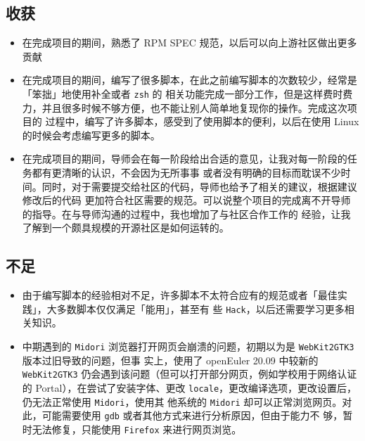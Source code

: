 \documentclass[letterpaper,12pt]{article}
\begin{document}
\subsection{收获}
    \begin{itemize}
        \item 在完成项目的期间，熟悉了 RPM SPEC 规范，以后可以向上游社区做出更多贡献
        \item 在完成项目的期间，编写了很多脚本，在此之前编写脚本的次数较少，经常是「笨拙」地使用补全或者 \verb!zsh! 的
        相关功能完成一部分工作，但是这样费时费力，并且很多时候不够方便，也不能让别人简单地复现你的操作。完成这次项目的
        过程中，编写了许多脚本，感受到了使用脚本的便利，以后在使用 Linux 的时候会考虑编写更多的脚本。
        \item 在完成项目的期间，导师会在每一阶段给出合适的意见，让我对每一阶段的任务都有更清晰的认识，不会因为无所事事
        或者没有明确的目标而耽误不少时间。同时，对于需要提交给社区的代码，导师也给予了相关的建议，根据建议修改后的代码
        更加符合社区需要的规范。可以说整个项目的完成离不开导师的指导。在与导师沟通的过程中，我也增加了与社区合作工作的
        经验，让我了解到一个颇具规模的开源社区是如何运转的。
    \end{itemize}

\subsection{不足}
    \begin{itemize}
        \item 由于编写脚本的经验相对不足，许多脚本不太符合应有的规范或者「最佳实践」，大多数脚本仅仅满足「能用」，甚至有
        些 \verb!Hack!，以后还需要学习更多相关知识。
        \item 中期遇到的 \verb!Midori! 浏览器打开网页会崩溃的问题，初期以为是 \verb!WebKit2GTK3! 版本过旧导致的问题，但事
        实上，使用了 openEuler 20.09 中较新的 \verb!WebKit2GTK3! 仍会遇到该问题（但可以打开部分网页，例如学校用于网络认证
        的 Portal），在尝试了安装字体、更改 \verb!locale!，更改编译选项，更改设置后，仍无法正常使用 \verb!Midori!，使用其
        他系统的 \verb!Midori! 却可以正常浏览网页。对此，可能需要使用 \verb!gdb! 或者其他方式来进行分析原因，但由于能力不
        够，暂时无法修复，只能使用 \verb!Firefox! 来进行网页浏览。
    \end{itemize}
\end{document}
